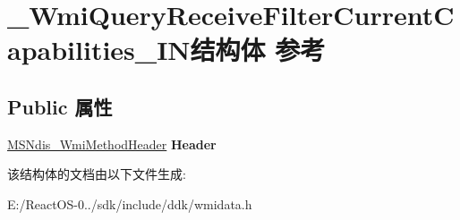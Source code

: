 \hypertarget{struct___wmi_query_receive_filter_current_capabilities___i_n}{}\section{\+\_\+\+Wmi\+Query\+Receive\+Filter\+Current\+Capabilities\+\_\+\+I\+N结构体 参考}
\label{struct___wmi_query_receive_filter_current_capabilities___i_n}
\subsection*{Public 属性}
\begin{DoxyCompactItemize}
\item 
\mbox{\label{struct___wmi_query_receive_filter_current_capabilities___i_n_a875def06881cbe08a0ad3ad7cead552a}} 
\hyperlink{struct___m_s_ndis___wmi_method_header}{M\+S\+Ndis\+\_\+\+Wmi\+Method\+Header} {\bfseries Header}
\end{DoxyCompactItemize}


该结构体的文档由以下文件生成\+:\begin{DoxyCompactItemize}
\item 
E\+:/\+React\+O\+S-\/0../sdk/include/ddk/wmidata.\+h\end{DoxyCompactItemize}
